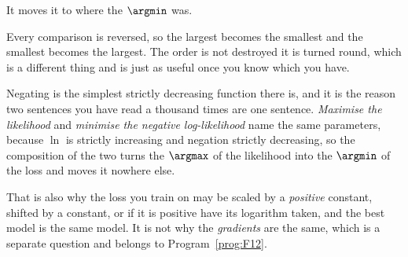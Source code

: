 \begin{fr}
\begin{ansblock}
It moves it to where the $\argmin$ was.
\end{ansblock}

Every comparison is reversed, so the largest becomes the smallest and the
smallest becomes the largest. The order is not destroyed \dash{} it is turned
round, which is a different thing and is just as useful once you know which you
have.

\begin{aibox}
Negating is the simplest strictly decreasing function there is, and it is the
reason two sentences you have read a thousand times are one sentence.
\emph{Maximise the likelihood} and \emph{minimise the negative log-likelihood}
name the same parameters, because $\ln$ is strictly increasing and negation
strictly decreasing, so the composition of the two turns the $\argmax$ of the
likelihood into the $\argmin$ of the loss and moves it nowhere else.

That is also why the loss you train on may be scaled by a \emph{positive}
constant, shifted by a constant, or \dash{} if it is positive \dash{} have its
logarithm taken, and the best model is the same model. It is not why
the \emph{gradients} are the same, which is a separate question and belongs to
Program~\ref{prog:F12}.
\end{aibox}
\end{fr}


